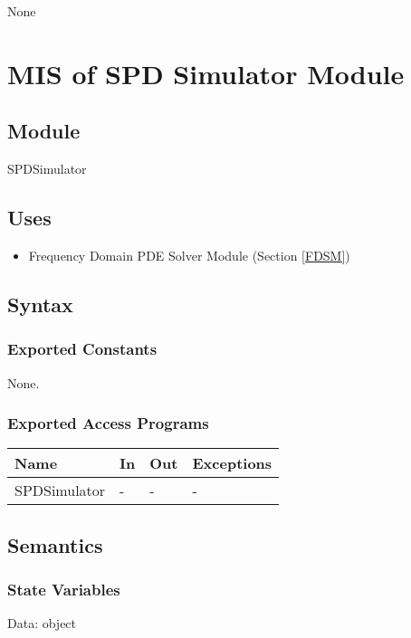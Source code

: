 \documentclass[12pt, titlepage]{article}
\begin{document}
	None \newpage %
	\section{MIS of SPD Simulator Module} \label{SSM}
	
	
	\subsection{Module} SPDSimulator
	
	\subsection{Uses} \begin{itemize} \item Frequency Domain PDE Solver Module
		(Section \ref{FDSM}) \end{itemize}
	
	\subsection{Syntax}
	
	\subsubsection{Exported Constants} None. \subsubsection{Exported Access
		Programs}
	
	\begin{center} \begin{tabular}{p{4cm} p{4cm} p{4cm} p{2cm}} \hline \textbf{Name}
			& \textbf{In} & \textbf{Out} & \textbf{Exceptions} \\ \hline SPDSimulator & - &
			- & - \\ \hline \end{tabular} \end{center}
	
	\subsection{Semantics}
	
	\subsubsection{State Variables}
	
	Data: object
	
\end{document}
